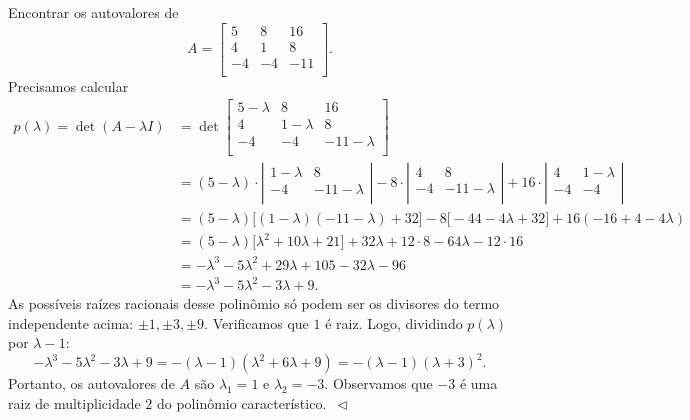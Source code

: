 \begin{ex}\label{3x3}
	Encontrar os autovalores de
	\begin{equation}
	A =
	\left[
	\begin{array}{ccc}
	5 & 8 & 16 \\
	4 & 1 & 8 \\
	-4 & -4 & -11 \\
	\end{array}
	\right].
	\end{equation} Precisamos calcular
        \begin{align*}
	p(\lambda) = \det (A-\lambda I) & = \det
	\left[
	\begin{array}{ccc}
	5-\lambda & 8 & 16 \\
	4 & 1-\lambda & 8 \\
	-4 & -4 & -11-\lambda \\
	\end{array}
	\right] \\
	& = (5-\lambda) \cdot
	\left|
	\begin{array}{cc}
	1-\lambda & 8 \\
	-4 & -11-\lambda \\
	\end{array}
	\right| -8 \cdot
	\left|
	\begin{array}{cc}
	4 & 8 \\
	-4 & -11-\lambda \\
	\end{array}
	\right| + 16 \cdot
	\left|
	\begin{array}{cc}
	4 & 1-\lambda \\
	-4 & -4 \\
	\end{array}
	\right| \\
	& = (5-\lambda)\big[ (1-\lambda)(-11-\lambda) +32 \big] - 8 \big[ -44-4\lambda +32 \big] + 16 (-16 + 4 -4\lambda) \\
	& = (5-\lambda)\big[ \lambda^2 + 10 \lambda + 21 \big] + 32 \lambda + 12 \cdot 8 - 64\lambda - 12\cdot 16 \\
	& = -\lambda^3 - 5 \lambda^2 + 29 \lambda + 105  - 32 \lambda - 96 \\
	& = -\lambda^3 - 5 \lambda^2 - 3 \lambda + 9.
          \end{align*}
          As possíveis raízes racionais desse polinômio só podem ser os divisores do termo independente acima: $\pm 1, \pm 3, \pm9$. Verificamos que $1$ é raiz. Logo, dividindo $p(\lambda)$ por $\lambda - 1$:
	\begin{equation}
	-\lambda^3 - 5 \lambda^2 - 3 \lambda + 9 = -(\lambda - 1)(\lambda^2 + 6\lambda + 9) = -(\lambda - 1)(\lambda + 3)^2.
	\end{equation} Portanto, os autovalores de $A$ são $\lambda_1 = 1$ e $\lambda_2 = -3$. Observamos que $-3$ é uma raiz de multiplicidade $2$ do polinômio característico. $\, \lhd$
\end{ex}

